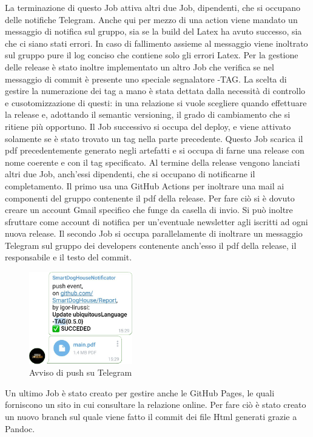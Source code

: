         La terminazione di questo Job attiva altri due Job, dipendenti, che si occupano delle notifiche Telegram. Anche qui per mezzo di una action viene mandato un messaggio di notifica sul gruppo, sia se la build del Latex ha avuto successo, sia che ci siano stati errori. In caso di fallimento assieme al messaggio viene inoltrato sul gruppo pure il log conciso che contiene solo gli errori Latex. 
        Per la gestione delle release è stato inoltre implementato un altro Job che verifica se nel messaggio di commit è presente uno speciale segnalatore -TAG{}. 
        La scelta di gestire la numerazione dei tag a mano è stata dettata dalla necessità di controllo e cusotomizzazione di questi: in una relazione si vuole scegliere quando effettuare la release e, adottando il semantic versioning, il grado di cambiamento che si ritiene più opportuno.
        Il Job successivo si occupa del deploy, e viene attivato solamente se è stato trovato un tag nella parte precedente. Questo Job scarica il pdf precedentemente generato negli artefatti e si occupa di farne una release con nome coerente e con il tag specificato. 
        Al termine della release vengono lanciati altri due Job, anch'essi dipendenti, che si occupano di notificarne il completamento. 
        Il primo usa una GitHub Actions per inoltrare una mail ai componenti del gruppo contenente il pdf della release. Per fare ciò si è dovuto creare un account Gmail specifico che funge da casella di invio. Si può inoltre sfruttare come account di notifica per un'eventuale newsletter agli iscritti ad ogni nuova release. 
        Il secondo Job si occupa parallelamente di inoltrare un messaggio Telegram sul gruppo dei developers contenente anch'esso il pdf della release, il responsabile e il testo del commit. 
        \begin{figure}[H]
            \caption{Avviso di push su Telegram}
            \centering
           \includegraphics[width=0.4\textwidth]{Images/pushTelegram.png}
        \end{figure}
        Un ultimo Job è stato creato per gestire anche le GitHub Pages, le quali forniscono un sito in cui consultare la relazione online. Per fare ciò è stato   creato un nuovo branch sul quale viene fatto il commit dei file Html generati grazie a Pandoc.
